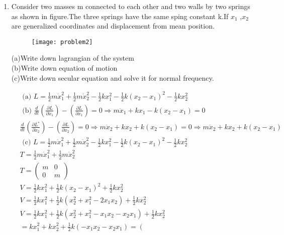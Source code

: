 \begin{enumerate}
\item Consider two masses m connected to each other and two walls by two springs as shown in figure.The three springs have the same sping constant k.If $x_1$ ,$x_2$ are generalized coordinates and displacement from mean position.\\
\begin{figure}[H]
	\centering
	\texttt{[image: problem2]}
\end{figure}
(a)Write down lagrangian of the system\\
(b)Write down equation of motion\\
(c)Write down secular equation and solve it for normal frequency.
\begin{answer}
	\begin{align*}
	&\text { (a) } L=\frac{1}{2} m \dot{x}_{1}^{2}+\frac{1}{2} m \dot{x}_{2}^{2}-\frac{1}{2} k x_{1}^{2}-\frac{1}{2} k\left(x_{2}-x_{1}\right)^{2}-\frac{1}{2} k x_{2}^{2}\\
	&\text { (b) } \frac{d}{d t}\left(\frac{\partial L}{\partial \dot{x}_{1}}\right)-\left(\frac{\partial L}{\partial x_{1}}\right)=0 \Rightarrow m \ddot{x}_{1}+k x_{1}-k\left(x_{2}-x_{1}\right)=0\\
	&\frac{d}{d t}\left(\frac{\partial L^{*}}{\partial \dot{x}_{2}}\right)-\left(\frac{\partial L}{\partial x_{2}}\right)=0 \Rightarrow m \ddot{x}_{2}+k x_{2}+k\left(x_{2}-x_{1}\right)=0 \Rightarrow m \ddot{x}_{2}+k x_{2}+k\left(x_{2}-x_{1}\right)\\
	&\text { (c) } L=\frac{1}{2} m \dot{x}_{1}^{2}+\frac{1}{2} m \dot{x}_{2}^{2}-\frac{1}{2} k x_{1}^{2}-\frac{1}{2} k\left(x_{2}-x_{1}\right)^{2}-\frac{1}{2} k x_{2}^{2}\\
	&T=\frac{1}{2} m \dot{x}_{1}^{2}+\frac{1}{2} m \dot{x}_{2}^{2}\\
	&T=\left(\begin{array}{ll}
	m & 0 \\
	0 & m
	\end{array}\right)\\
	&V=\frac{1}{2} k x_{1}^{2}+\frac{1}{2} k\left(x_{2}-x_{1}\right)^{2}+\frac{1}{2} k x_{2}^{2}\\
	&V=\frac{1}{2} k x_{1}^{2}+\frac{1}{2} k\left(x_{2}^{2}+x_{1}^{2}-2 x_{1} x_{2}\right)+\frac{1}{2} k x_{2}^{2}\\
	&V=\frac{1}{2} k x_{1}^{2}+\frac{1}{2} k\left(x_{2}^{2}+x_{1}^{2}-x_{1} x_{2}-x_{2} x_{1}\right)+\frac{1}{2} k x_{2}^{2}\\
	&=k x_{1}^{2}+k x_{2}^{2}+\frac{1}{2} k\left(-x_{1} x_{2}-x_{2} x_{1}\right)=\left(\begin{array}{cc}

\end{array}
\end{align*}
\end{answer}
\end{enumerate}
